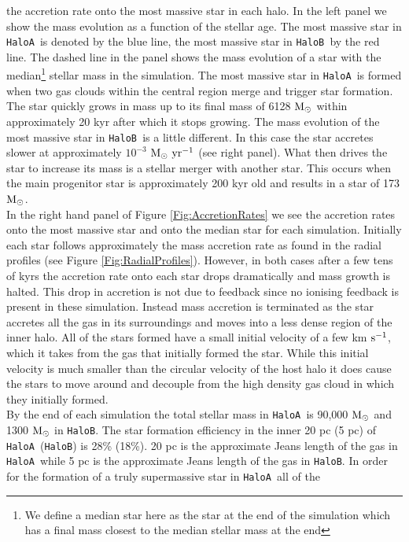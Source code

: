 \documentclass[graphics, twocolumn, usenatbib]{mn2e}
\newcommand{\kms} {km $\rm{s^{-1}}$}
\newcommand{\msolar} {$\rm{M_{\odot}}~$}
\newcommand{\msolarc} {$\rm{M_{\odot}}$}
\newcommand{\msolaryr} {$\rm{M_{\odot}~yr^{-1}}~$}
\newcommand{\ha} {\texttt{HaloA~}}
\newcommand{\hb} {\texttt{HaloB~}}
\newcommand{\hbc} {\texttt{HaloB}}
\begin{document}
the accretion rate onto the most massive star in each halo. In the left panel we show the mass
evolution as a function of the stellar age. The most massive star in \ha is denoted by the blue line,
the most massive star in \hb by the red line. The dashed line in the panel shows the mass evolution
of a star with the median\footnote{We define a
        median star here as the star at the end of the simulation which has a final mass
        closest to the median stellar mass at the end} stellar mass in the simulation. The most massive star in \ha is formed
when two gas clouds within the central region merge and trigger star formation. The star quickly
grows in mass up to its final mass of 6128 \msolar within approximately 20 kyr after which
it stops growing. The mass evolution of the most massive star in
\hb is a little different. In this case the star accretes slower at approximately $10^{-3}$
\msolaryr (see right panel). What then drives the star to increase its mass is a stellar merger
with another star. This occurs when the main progenitor star is approximately 200 kyr old and
results in a star of 173 \msolarc.\\
\indent In the right hand panel of Figure \ref{Fig:AccretionRates} we see the accretion rates onto
the most massive star and onto the median star for each simulation. Initially each star follows approximately the mass accretion rate as found in the radial profiles (see Figure \ref{Fig:RadialProfiles}).
However, in both cases after a few tens of kyrs the accretion rate onto each star drops dramatically and mass growth is halted. This drop in accretion is not due to feedback since no ionising feedback
is present in these simulation. Instead mass accretion is terminated as the star accretes all the gas in its surroundings and moves into a less dense region of the inner halo. All of the stars formed have a small initial velocity of a few \kms, which it takes from the gas that initially formed the star. While this 
initial velocity is much smaller than the circular
velocity of the host halo it does cause the stars to move around and decouple from the high density gas cloud in which they initially formed. \\
\indent By the end of each simulation the total stellar mass in \ha is 90,000 \msolar and 1300
\msolar in \hbc. The star formation efficiency in the inner 20 pc (5 pc) of \ha (\hbc) is 28\%
(18\%). 20 pc is the approximate Jeans length of the gas in \ha while 5 pc is the approximate Jeans
length of the gas in \hbc. In order for the formation of a truly supermassive star in \ha all of the
\end{document}
